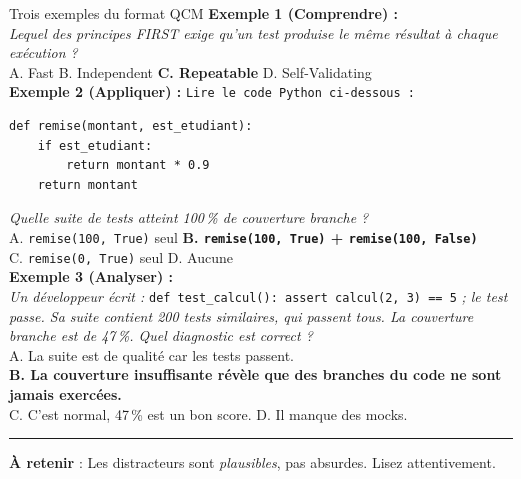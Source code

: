 \documentclass[aspectratio=169,11pt]{beamer}
\newcommand{\takeaway}[1]{%
\vfill\begin{beamercolorbox}[wd=\linewidth,sep=0.4em]{}
\color{accent2}\rule[0.6ex]{1.2em}{1.2pt}\hspace{0.4em}%
\textbf{\color{accent2}\small À retenir} \textcolor{textsoft}{:} %
{\small\color{textmain}#1}
\end{beamercolorbox}}
\begin{document}
\begin{frame}[fragile,t,shrink=15]{Trois exemples du format QCM}
\footnotesize
\textbf{Exemple 1 (Comprendre) :}\\
\textit{Lequel des principes FIRST exige qu'un test produise le même résultat à chaque exécution ?}\\
\hspace{1em} A. Fast \quad B. Independent \quad \textbf{C. Repeatable} \quad D. Self-Validating\\[0.5em]

\textbf{Exemple 2 (Appliquer) :} \texttt{Lire le code Python ci-dessous :}
\begin{lstlisting}[style=pythondark]
def remise(montant, est_etudiant):
    if est_etudiant:
        return montant * 0.9
    return montant
\end{lstlisting}
\textit{Quelle suite de tests atteint 100\,\% de couverture branche ?}\\
\hspace{1em} A. \texttt{remise(100, True)} seul \quad
\textbf{B. \texttt{remise(100, True)} + \texttt{remise(100, False)}}\\
\hspace{1em} C. \texttt{remise(0, True)} seul \quad
D. Aucune\\[0.5em]

\textbf{Exemple 3 (Analyser) :}\\
\textit{Un développeur écrit :} \texttt{def test\_calcul(): assert calcul(2, 3) == 5}\textit{ ; le test passe. Sa suite contient 200 tests similaires, qui passent tous. La couverture branche est de 47\,\%. Quel diagnostic est correct ?}\\
\hspace{1em} A. La suite est de qualité car les tests passent. \\
\hspace{1em} \textbf{B. La couverture insuffisante révèle que des branches du code ne sont jamais exercées.}\\
\hspace{1em} C. C'est normal, 47\,\% est un bon score. \quad
D. Il manque des mocks.
\takeaway{Les distracteurs sont \emph{plausibles}, pas absurdes. Lisez attentivement.}
\end{frame}

\end{document}

